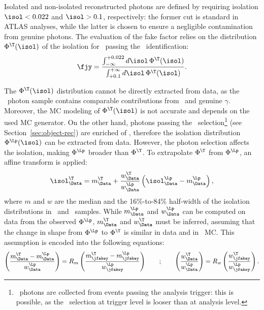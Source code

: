 Isolated and non-isolated reconstructed photons are defined by requiring isolation $\isol<0.022$ and $\isol>0.1$, respectively: the former cut is standard in ATLAS analyses, while the latter is chosen to ensure a negligible contamination from genuine photons. The evaluation of the fake factor relies on the distribution $\Phi^\T(\isol)$ of the isolation for \jfakey\ passing the \T\ identification: 
\begin{equation}
\fjy=\frac{\int_{-\infty}^{+0.022}d\isol\,\Phi^\T(\isol)}{\int_{+0.1}^{+\infty}d\isol\,\Phi^\T(\isol)}.
\label{eq:calc-fjy}
\end{equation}

The $\Phi^\T(\isol)$ distribution cannot be directly extracted from data, as the \T\ photon sample contains comparable contributions from \jfakey\ and genuine $\gamma$. Moreover, the MC modeling of $\Phi^\T(\isol)$ is not accurate and depends on the used MC generator.
On the other hand, photons passing the \Lp\ selection\footnote{
\Lp\ photons are collected from events passing the analysis trigger: this is possible, as the \T\ selection at trigger level is looser than at analysis level.
} (see Section~\ref{sec:object-rec}) are enriched of \jfakey, therefore the isolation distribution $\Phi^\Lp(\isol)$ can be extracted from data. However, the photon selection affects the isolation, making $\Phi^\Lp$ broader than $\Phi^\T$. To extrapolate $\Phi^\T$ from $\Phi^\Lp$, an affine transform is applied:
\begin{equation}
\isol^\T_{\Data} = m^\T_{\Data} + \frac{w^\T_{\Data}}{w^\Lp_{\Data}}\left(\isol^\Lp_{\Data}-m^\Lp_{\Data}\right),
\label{eq:affine-transf}
\end{equation}
where $m$ and $w$ are the median and the 16\%-to-84\% half-width of the isolation distributions in \Lp\ and \T\ samples. While $m^\Lp_{\Data}$ and $w^\Lp_{\Data}$ can be computed on data from the observed $\Phi^\Lp$, $m^\T_{\Data}$ and $w^\T_{\Data}$ must be inferred, assuming that the change in shape from $\Phi^\Lp$ to $\Phi^\T$ is similar in data and in \jfakey\ MC. This assumption is encoded into the following equations:
\begin{equation}
\left(\frac{m^\T_{\Data}-m^\Lp_{\Data}}{w^\Lp_{\Data}}\right) = R_m \left(\frac{m^\T_{\jfakey}-m^\Lp_{\jfakey}}{w^\Lp_{\jfakey}}\right)
~~~~~~;~~~~~~
\left(\frac{w^\T_{\Data}}{w^\Lp_{\Data}}\right) = R_w \left(\frac{w^\T_{\jfakey}}{w^\Lp_{\jfakey}}\right).
\label{eq:def-Rm-Rw}
\end{equation}
